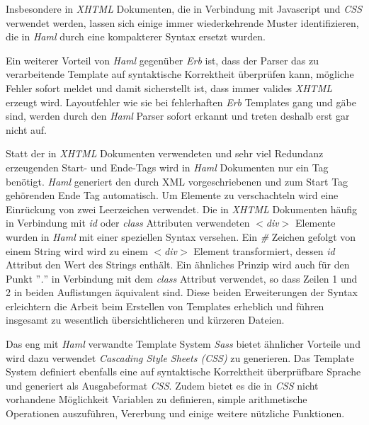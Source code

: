 

Insbesondere in \textit{XHTML} Dokumenten, die in Verbindung mit Javascript und
\textit{CSS} verwendet werden, lassen sich einige immer wiederkehrende Muster
identifizieren, die in \textit{Haml} durch eine kompakterer Syntax ersetzt
wurden.

Ein weiterer Vorteil von \textit{Haml} gegenüber \textit{Erb} ist,
dass der Parser das zu verarbeitende Template auf syntaktische
Korrektheit überprüfen kann, mögliche Fehler sofort meldet und damit
sicherstellt ist, dass immer valides \textit{XHTML} erzeugt
wird. Layoutfehler wie sie bei fehlerhaften \textit{Erb} Templates
gang und gäbe sind, werden durch den \textit{Haml} Parser sofort
erkannt und treten deshalb erst gar nicht auf.

Statt der in \textit{XHTML} Dokumenten verwendeten und sehr viel
Redundanz erzeugenden Start- und Ende-Tags wird in \textit{Haml}
Dokumenten nur ein Tag benötigt. \textit{Haml} generiert den durch XML
 vorgeschriebenen und
zum Start Tag gehörenden Ende Tag automatisch. Um Elemente zu
verschachteln wird eine Einrückung von zwei Leerzeichen verwendet. Die
in \textit{XHTML} Dokumenten häufig in Verbindung mit \textit{id} oder
\textit{class} Attributen verwendeten \textit{$<$div$>$} Elemente
wurden in \textit{Haml} mit einer speziellen Syntax versehen. Ein
\textit{\#} Zeichen gefolgt von einem String wird wird zu einem
\textit{$<$div$>$} Element transformiert, dessen \textit{id} Attribut
den Wert des Strings enthält. Ein ähnliches Prinzip wird auch für den
Punkt ''\textit{.}''  in Verbindung mit dem \textit{class} Attribut
verwendet, so dass Zeilen 1 und 2 in beiden Auflistungen äquivalent
sind. Diese beiden Erweiterungen der Syntax erleichtern die Arbeit
beim Erstellen von Templates erheblich und führen insgesamt zu
wesentlich übersichtlicheren und kürzeren Dateien.

Das eng mit \textit{Haml} verwandte Template System \textit{Sass}
bietet ähnlicher Vorteile und wird dazu verwendet \textit{Cascading
  Style Sheets (CSS)} zu generieren. Das Template System definiert
ebenfalls eine auf syntaktische Korrektheit überprüfbare Sprache und
generiert als Ausgabeformat \textit{CSS}. Zudem bietet es die in
\textit{CSS} nicht vorhandene Möglichkeit Variablen zu definieren,
simple arithmetische Operationen auszuführen, Vererbung und einige
weitere nützliche Funktionen.

